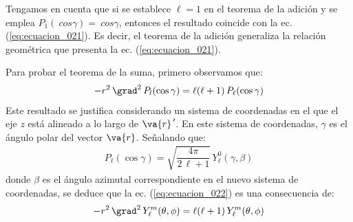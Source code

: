 Tengamos en cuenta que si se establece $\ell = 1$ en el teorema de la adición y se emplea $P_{1} (\ cos \gamma) = \ cos \gamma$, entonces el resultado coincide con la ec. (\ref{eq:ecuacion_021}). Es decir, el teorema de la adición generaliza la relación geométrica que presenta la ec. (\ref{eq:ecuacion_021}).
\par
Para probar el teorema de la suma, primero observamos que:
\begin{align}
- r^{2} \, \grad^{2} \, P_{l} (\cos \gamma) = \ell ( \ell + 1) \, P_{\ell} (\cos \gamma)
\label{eq:ecuacion_022}
\end{align}
Este resultado se justifica considerando un sistema de coordenadas en el que el eje $z$ está alineado a lo largo de $\va{r}^{\, \prime}$. En este sistema de coordenadas, $\gamma$ es el ángulo polar del vector $\va{r}$. Señalando que:
\begin{align*}
P_{\ell} (\cos \gamma) = \sqrt{\dfrac{4 \pi}{2 \, \ell + 1}} \, Y_{\ell}^{0} (\gamma, \beta)
\end{align*}
donde $\beta$ es el ángulo azimutal correspondiente en el nuevo sistema de coordenadas, se deduce que la ec. (\ref{eq:ecuacion_022}) es una consecuencia de:
\begin{align}
-r^{2} \, \grad^{2} \, Y_{\ell}^{m} (\theta, \phi) = \ell (\ell + 1) \, Y_{\ell}^{m} (\theta, \phi)
\label{eq:ecuacion_015}
\end{align}

